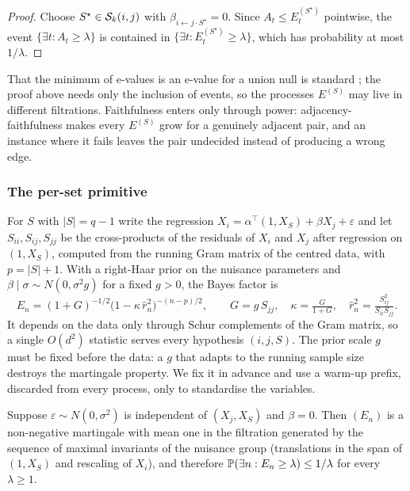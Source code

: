 \begin{proof}
Choose $S^\star\in\mathcal{S}_k(i,j)$ with $\beta_{i\leftarrow j\cdot S^\star}=0$.
Since $A_t\le E^{(S^\star)}_t$ pointwise, the event $\{\exists t:A_t\ge\lambda\}$
is contained in $\{\exists t:E^{(S^\star)}_t\ge\lambda\}$, which has probability
at most $1/\lambda$.
\end{proof}

\noindent That the minimum of e-values is an e-value for a union null is
standard \citep{vovk2021evalues}; the proof above needs only the inclusion of
events, so the processes $E^{(S)}$ may live in different filtrations. Faithfulness enters only through power: adjacency-faithfulness makes every
$E^{(S)}$ grow for a genuinely adjacent pair, and an instance where it fails
leaves the pair undecided instead of producing a wrong edge.

\subsubsection{The per-set primitive}\label{sec:primitive}

For $S$ with $|S|=q-1$ write the regression
$X_i=\alpha^\top(1,X_S)+\beta X_j+\varepsilon$ and let $S_{ii},S_{ij},S_{jj}$
be the cross-products of the residuals of $X_i$ and $X_j$ after regression on
$(1,X_S)$, computed from the running Gram matrix of the centred data, with
$p=|S|+1$. With a right-Haar prior on the nuisance parameters and
$\beta\mid\sigma\sim N(0,\sigma^2 g)$ for a fixed $g>0$, the Bayes factor is
\begin{equation}\label{eq:safelinear}
E_n=(1+G)^{-1/2}\bigl(1-\kappa\,\hat r_n^2\bigr)^{-(n-p)/2},\qquad
G=g\,S_{jj},\quad \kappa=\tfrac{G}{1+G},\quad
\hat r_n^2=\tfrac{S_{ij}^2}{S_{ii}S_{jj}}.
\end{equation}
It depends on the data only through Schur complements of the Gram matrix, so a
single $O(d^2)$ statistic serves every hypothesis $(i,j,S)$. The prior scale
$g$ must be fixed before the data: a $g$ that adapts to the running sample size
destroys the martingale property. We fix it in advance and use a warm-up prefix,
discarded from every process, only to standardise the variables.

\begin{proposition}\label{prop:safelinear}
Suppose $\varepsilon\sim N(0,\sigma^2)$ is independent of $(X_j,X_S)$ and
$\beta=0$. Then $(E_n)$ is a non-negative martingale with mean one in the
filtration generated by the sequence of maximal invariants of the nuisance group
(translations in the span of $(1,X_S)$ and rescaling of $X_i$), and therefore
$\mathbb{P}(\exists n: E_n\ge\lambda)\le 1/\lambda$ for every $\lambda\ge1$.
\end{proposition}

